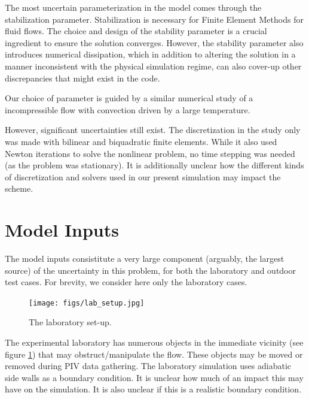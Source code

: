 \documentclass{article}
\begin{document}
The most uncertain parameterization in the model comes through the
stabilization parameter. Stabilization is necessary for Finite Element
Methods for fluid flows\cite{franca1992stabilized}. The choice and
design of the stability parameter is a crucial ingredient to ensure the
solution converges. However, the stability parameter also introduces
numerical dissipation, which in addition to altering the solution in a
manner inconsistent with the physical simulation regime, can also
cover-up other discrepancies that might exist in the code. 

Our choice of parameter is guided by a similar numerical
study\cite{Becker2002428} of a incompressible flow with
convection driven by a large temperature. 

However, significant uncertainties still exist. The discretization in
the study only was made with bilinear and biquadratic finite elements. 
While it also used Newton iterations to solve the nonlinear problem, no
time stepping was needed (as the problem was stationary). It is
additionally unclear how the different kinds of discretization and
solvers used in our present simulation may impact the scheme.

%
%
%
\section{Model Inputs}

The model inputs consistitute a very large component (arguably, the
largest source) of the uncertainty in this problem, for both the
laboratory and outdoor test cases. For brevity, we consider here only
the laboratory cases. 

  \begin{figure}[!htb]
    \begin{center}
     \texttt{[image: figs/lab\_setup.jpg]}
     \caption{The laboratory set-up.}
     \label{lab}
    \end{center}
  \end{figure}

The experimental laboratory has numerous objects
in the immediate vicinity (see figure \ref{lab}) that may
obstruct/manipulate the flow. These objects may be moved or removed
during PIV data gathering. The laboratory simulation uses adiabatic side
walls as a boundary condition. It is unclear how much of an impact this
may have on the simulation. It is also unclear if this is a realistic
boundary condition. 
\end{document}
